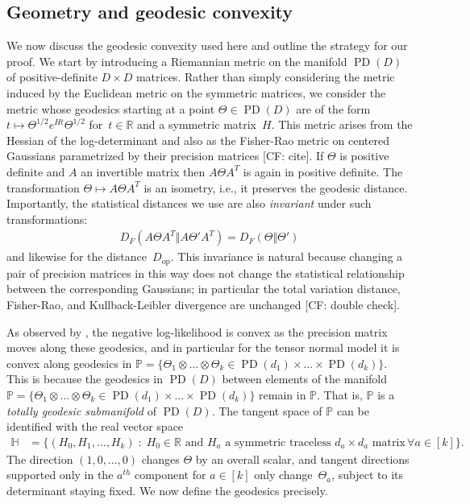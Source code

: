 \documentclass[aos]{imsart}
\theoremstyle{definition}
\numberwithin{equation}{section}
\DeclareMathOperator{\op}{op}
\DeclareMathOperator{\PD}{PD}
\DeclarePairedDelimiter{\norm}{\lVert}{\rVert}
\newcommand{\R}{{\mathbb{R}}}
\renewcommand{\P}{{\mathbb{P}}}
\renewcommand{\H}{{\mathbb{H}}}
\newcommand{\ot}{\otimes}
\newcommand{\CF}[1]{{\color{purple}[CF: #1]}}
\begin{document}
\subsection{Geometry and geodesic convexity}\label{subsec:geom}
We now discuss the geodesic convexity used here and outline the strategy for our proof.
We start by introducing a Riemannian metric on the manifold $\PD(D)$ of positive-definite $D\times D$ matrices.
Rather than simply considering the metric induced by the Euclidean metric on the symmetric matrices, we consider the metric whose geodesics starting at a point $\Theta \in \PD(D)$ are of the form $t \mapsto \Theta^{1/2} e^{Ht} \Theta^{1/2}$ for~$t \in \R$ and a symmetric matrix~$H$. %
This metric arises from the Hessian of the log-determinant \citep{bhatia2009positive} and also as the Fisher-Rao metric on centered Gaussians parametrized by their precision matrices \CF{cite}.
If $\Theta$ is positive definite and $A$ an invertible matrix then $A\Theta A^T$ is again in positive definite.
The transformation $\Theta \mapsto A\Theta A^T$ is an isometry, i.e., it preserves the geodesic distance.
Importantly, the statistical distances we use are also \emph{invariant} under such transformations:
\begin{align*}
  D_F(A \Theta A^T \Vert A \Theta' A^T) = D_F(\Theta \Vert \Theta')
\end{align*}
and likewise for the distance~$D_{\op}$.
This invariance is natural because changing a pair of precision matrices in this way does not change the statistical relationship between the corresponding Gaussians; in particular the total variation distance, Fisher-Rao, and Kullback-Leibler divergence are unchanged \CF{double check}.

As observed by \cite{wiesel2012geodesic}, the negative log-likelihood is convex as the precision matrix moves along these geodesics, and in particular for the tensor normal model it is convex along geodesics in $\P = \{ \Theta_1 \ot \dots \ot \Theta_k \in \PD(d_1) \times \dots \times \PD(d_k) \}$. This is because the geodesics in $\PD(D)$ between elements of the manifold $\P = \{ \Theta_1 \ot \dots \ot \Theta_k \in \PD(d_1) \times \dots \times \PD(d_k) \}$ remain in $\P$. That is, $\P$ is a \emph{totally geodesic submanifold} of $\PD(D)$.  The tangent space of $\P$ can be identified with the real vector space
\begin{align*}
  \H &= \{ (H_0, H_1,\dots,H_k) \;:\; H_0 \in \R \text{ and }H_a \text{ a symmetric traceless $d_a \times d_a$ matrix} \, \forall a \in [k]  \}.
\end{align*}
The direction $(1, 0, \dots, 0)$ changes $\Theta$ by an overall scalar, and tangent directions supported only in the $a^{th}$ component for $a \in [k]$ only change~$\Theta_a$, subject to its determinant staying fixed. We now define the geodesics precisely.
\end{document}
